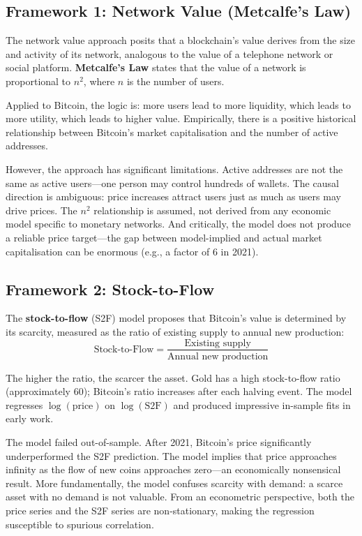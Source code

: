 \documentclass[11pt,a4paper]{article}
\newcommand{\keyword}[1]{\textbf{\textcolor{AccentOrange}{#1}}}
\begin{document}
\subsection{Framework 1: Network Value (Metcalfe's Law)}

The network value approach posits that a blockchain's value derives from the size and activity of its network, analogous to the value of a telephone network or social platform. \keyword{Metcalfe's Law} states that the value of a network is proportional to $n^2$, where $n$ is the number of users.

Applied to Bitcoin, the logic is: more users lead to more liquidity, which leads to more utility, which leads to higher value. Empirically, there is a positive historical relationship between Bitcoin's market capitalisation and the number of active addresses.

However, the approach has significant limitations. Active addresses are not the same as active users---one person may control hundreds of wallets. The causal direction is ambiguous: price increases attract users just as much as users may drive prices. The $n^2$ relationship is assumed, not derived from any economic model specific to monetary networks. And critically, the model does not produce a reliable price target---the gap between model-implied and actual market capitalisation can be enormous (e.g., a factor of 6 in 2021).

\subsection{Framework 2: Stock-to-Flow}

The \keyword{stock-to-flow} (S2F) model proposes that Bitcoin's value is determined by its scarcity, measured as the ratio of existing supply to annual new production:
$$\text{Stock-to-Flow} = \frac{\text{Existing supply}}{\text{Annual new production}}$$

The higher the ratio, the scarcer the asset. Gold has a high stock-to-flow ratio (approximately 60); Bitcoin's ratio increases after each halving event. The model regresses $\log(\text{price})$ on $\log(\text{S2F})$ and produced impressive in-sample fits in early work.

The model failed out-of-sample. After 2021, Bitcoin's price significantly underperformed the S2F prediction. The model implies that price approaches infinity as the flow of new coins approaches zero---an economically nonsensical result. More fundamentally, the model confuses scarcity with demand: a scarce asset with no demand is not valuable. From an econometric perspective, both the price series and the S2F series are non-stationary, making the regression susceptible to spurious correlation.
\end{document}
